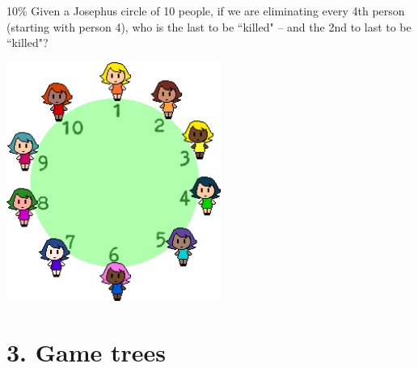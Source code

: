 \documentclass[a4paper,12pt]{book}
\begin{document}
        \begin{question}{5}{10\%}
            Given a Josephus circle of 10 people,
            if we are eliminating every 4th person (starting with person 4),
            who is the last to be ``killed" – and the 2nd to last to be ``killed"?

            \begin{center}
                \includegraphics[width=7cm]{images/josephus-10.png}
            \end{center}
        \end{question}
       
    \newpage
    \section*{3. Game trees}
\end{document}
